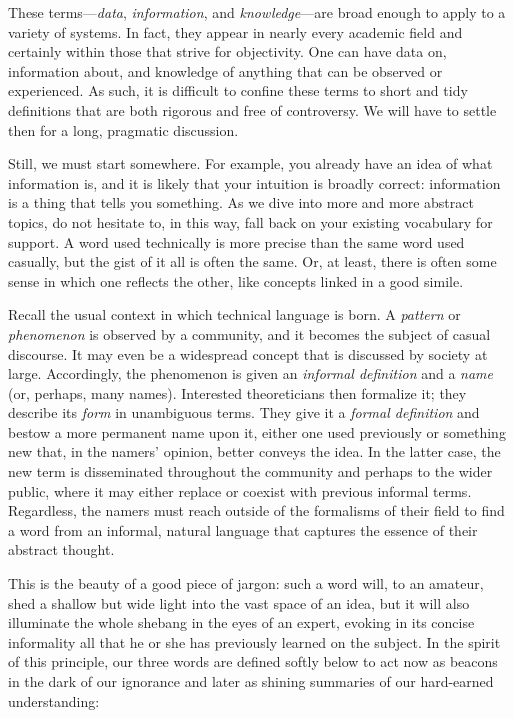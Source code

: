 These terms---\textit{data}, \textit{information}, and \textit{knowledge}---are broad enough to apply to a variety of systems. In fact, they appear in nearly every academic field and certainly within those that strive for objectivity. One can have data on, information about, and knowledge of anything that can be observed or experienced. As such, it is difficult to confine these terms to short and tidy definitions that are both rigorous and free of controversy. We will have to settle then for a long, pragmatic discussion.

Still, we must start somewhere. For example, you already have an idea of what information is, and it is likely that your intuition is broadly correct: information is a thing that tells you something. As we dive into more and more abstract topics, do not hesitate to, in this way, fall back on your existing vocabulary for support. A word used technically is more precise than the same word used casually, but the gist of it all is often the same. Or, at least, there is often some sense in which one reflects the other, like concepts linked in a good simile.

Recall the usual context in which technical language is born. A \textit{pattern} or \textit{phenomenon} is observed by a community, and it becomes the subject of casual discourse. It may even be a widespread concept that is discussed by society at large. Accordingly, the phenomenon is given an \textit{informal definition} and a \textit{name} (or, perhaps, many names). Interested theoreticians then formalize it; they describe its \textit{form} in unambiguous terms. They give it a \textit{formal definition} and bestow a more permanent name upon it, either one used previously or something new that, in the namers' opinion, better conveys the idea. In the latter case, the new term is disseminated throughout the community and perhaps to the wider public, where it may either replace or coexist with previous informal terms. Regardless, the namers must reach outside of the formalisms of their field to find a word from an informal, natural language that captures the essence of their abstract thought.

This is the beauty of a good piece of jargon: such a word will, to an amateur, shed a shallow but wide light into the vast space of an idea, but it will also illuminate the whole shebang in the eyes of an expert, evoking in its concise informality all that he or she has previously learned on the subject. In the spirit of this principle, our three words are defined softly below to act now as beacons in the dark of our ignorance and later as shining summaries of our hard-earned understanding:


